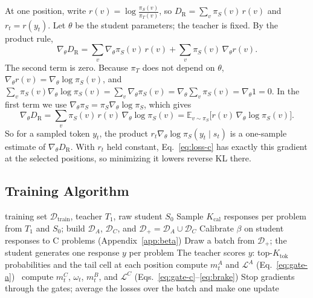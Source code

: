 \documentclass[10pt]{article}
\newcommand{\tsopd}{TS-OPD}
\begin{document}
At one position, write $r(v)=\log\frac{\pi_S(v)}{\pi_T(v)}$, so
$D_{\mathrm R}=\sum_v\pi_S(v)\,r(v)$ and $r_t=r(y_t)$. Let $\theta$ be the
student parameters; the teacher is fixed. By the product rule,
\begin{equation}
\nabla_\theta D_{\mathrm R}=\sum_v\nabla_\theta\pi_S(v)\,r(v)+\sum_v\pi_S(v)\,\nabla_\theta r(v).
\end{equation}
The second term is zero. Because $\pi_T$ does not depend on $\theta$,
$\nabla_\theta r(v)=\nabla_\theta\log\pi_S(v)$, and
$\sum_v\pi_S(v)\nabla_\theta\log\pi_S(v)=\sum_v\nabla_\theta\pi_S(v)
=\nabla_\theta\sum_v\pi_S(v)=\nabla_\theta 1=0$. In the first term we use
$\nabla_\theta\pi_S=\pi_S\nabla_\theta\log\pi_S$, which gives
\begin{equation}
\nabla_\theta D_{\mathrm R}=\sum_v\pi_S(v)\,r(v)\,\nabla_\theta\log\pi_S(v)
=\mathbb E_{v\sim\pi_S}\bigl[r(v)\,\nabla_\theta\log\pi_S(v)\bigr].
\end{equation}
So for a sampled token $y_t$, the product $r_t\nabla_\theta\log\pi_S(y_t\mid s_t)$
is a one-sample estimate of $\nabla_\theta D_{\mathrm R}$. With $r_t$ held
constant, Eq.~\ref{eq:loss-c} has exactly this gradient at the selected
positions, so minimizing it lowers reverse KL there.

\subsection{Training Algorithm}

\begin{algorithm}[H]
\caption{\tsopd{} training}
\label{alg:tsopd}
\begin{algorithmic}[1]
\Require training set $\mathcal D_{\mathrm{train}}$, teacher $T_1$, raw student $S_0$
\State Sample $K_{\mathrm{cal}}$ responses per problem from $T_1$ and $S_0$; build $\mathcal D_A$, $\mathcal D_C$, and $\mathcal D_+=\mathcal D_A\cup\mathcal D_C$
\State Calibrate $\beta$ on student responses to C problems (Appendix~\ref{app:beta})
  \State Draw a batch from $\mathcal D_+$; the student generates one response $y$ per problem
  \State The teacher scores $y$: top-$K_{\mathrm{tok}}$ probabilities and the tail cell at each position
   compute $m^A_t$ and $\mathcal L^A$ (Eq.~\ref{eq:gate-a})
  \Else\ compute $m^C_t$, $\omega_t$, $m^B_t$, and $\mathcal L^C$ (Eqs.~\ref{eq:gate-c}--\ref{eq:brake})
  \EndIf
  \State Stop gradients through the gates; average the losses over the batch and make one update
\EndFor
\end{algorithmic}
\end{algorithm}
\end{document}

